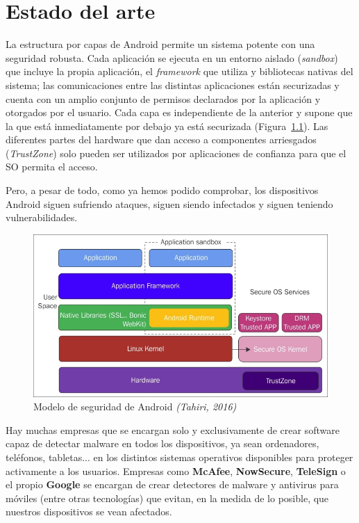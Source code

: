 \chapter{Estado del arte}

La estructura por capas de Android permite un sistema potente con una seguridad robusta. Cada aplicación se ejecuta en un entorno aislado (\textit{sandbox}) que incluye la propia aplicación, el \textit{framework} que utiliza y bibliotecas nativas del sistema; las comunicaciones entre las distintas aplicaciones están securizadas y cuenta con un amplio conjunto de permisos declarados por la aplicación y otorgados por el usuario. Cada capa es independiente de la anterior y supone que la que está inmediatamente por debajo ya está securizada (Figura~\ref{fig:stack}). Las diferentes partes del hardware que dan acceso a componentes arriesgados (\textit{TrustZone}) solo pueden ser utilizados por aplicaciones de confianza para que el SO permita el acceso.

Pero, a pesar de todo, como ya hemos podido comprobar, los dispositivos Android siguen sufriendo ataques, siguen siendo infectados y siguen teniendo vulnerabilidades.

\begin{figure}[H]
\centering
	\includegraphics[scale=1.8]{img/android-stack.jpg}
	\caption{Modelo de seguridad de Android \textit{(Tahiri, 2016)}}
	\label{fig:stack}
\end{figure}

Hay muchas empresas que se encargan solo y exclusivamente de crear software capaz de detectar malware en todos los dispositivos, ya sean ordenadores, teléfonos, tabletas... en los distintos sistemas operativos disponibles para proteger activamente a los usuarios. Empresas como \textbf{McAfee}, \textbf{NowSecure}, \textbf{TeleSign} o el propio \textbf{Google} se encargan de crear detectores de malware y antivirus para móviles (entre otras tecnologías) que evitan, en la medida de lo posible, que nuestros dispositivos se vean afectados.

